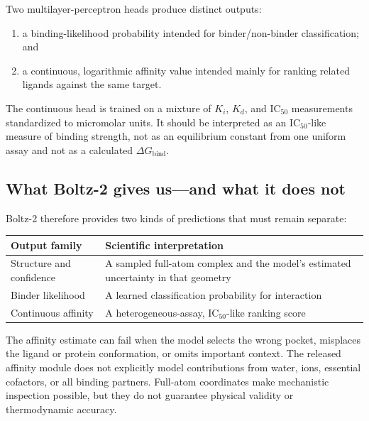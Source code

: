 Two multilayer-perceptron heads produce distinct outputs:

\begin{enumerate}
  \item a binding-likelihood probability intended for binder/non-binder
        classification; and
  \item a continuous, logarithmic affinity value intended mainly for ranking
        related ligands against the same target.
\end{enumerate}

The continuous head is trained on a mixture of $K_i$, $K_d$, and IC$_{50}$
measurements standardized to micromolar units. It should be interpreted as an
IC$_{50}$-like measure of binding strength, not as an equilibrium constant from
one uniform assay and not as a calculated $\Delta G_{\mathrm{bind}}$.

\subsection{What Boltz-2 gives us---and what it does not}

Boltz-2 therefore provides two kinds of predictions that must remain separate:

\begin{center}
\begin{tabular}{p{}p{}}
\toprule
\textbf{Output family} & \textbf{Scientific interpretation} \\
\midrule
Structure and confidence & A sampled full-atom complex and the model's
estimated uncertainty in that geometry \\
Binder likelihood & A learned classification probability for interaction \\
Continuous affinity & A heterogeneous-assay, IC$_{50}$-like ranking score \\
\bottomrule
\end{tabular}
\end{center}

The affinity estimate can fail when the model selects the wrong pocket,
misplaces the ligand or protein conformation, or omits important context. The
released affinity module does not explicitly model contributions from water,
ions, essential cofactors, or all binding partners. Full-atom coordinates make
mechanistic inspection possible, but they do not guarantee physical validity
or thermodynamic accuracy.
